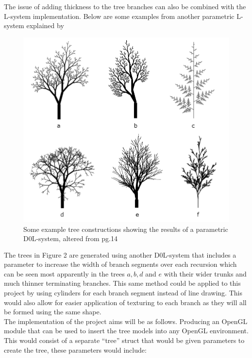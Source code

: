 \documentclass[progress]{cmpreport}
\begin{document}
The issue of adding thickness to the tree branches can also be combined with the L-system 
implementation. Below are some examples from another parametric L-system explained by 
\cite{prusinkiewicz1996systems} 

\begin{figure}[h]
        \includegraphics[scale=0.49]{tree_examples}
        \centering
        \caption{Some example tree constructions showing the results of a parametric D0L-system,  
                 altered from \cite{prusinkiewicz1996systems} pg.14}
\end{figure}

The trees in Figure 2 are generated using another D0L-system that includes a parameter to increase the 
width of branch segments over each recursion which can be seen most apparently in the trees 
$a, b, d$ and $e$ with their wider trunks and much thinner terminating branches. This same 
method could be applied to this project by using cylinders for each branch segment instead of 
line drawing. This would also allow for easier application of texturing to each branch as they 
will all be formed using the same shape. \\ 

The implementation of the project aims will be as follows. Producing an OpenGL module 
that can be used to insert the tree models into any OpenGL environment. This would consist of 
a separate ``tree'' struct that would be given parameters to create the tree, these parameters 
would include: 
\end{document}
